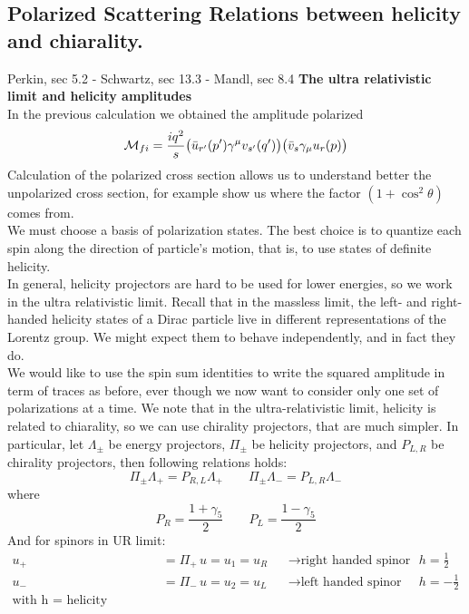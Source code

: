 \documentclass[TheoreticalPhy_ModB.tex]{subfiles}
\begin{document}
\subsection{Polarized Scattering Relations between helicity and chiarality.}
\textsf{Perkin, sec 5.2 - Schwartz, sec 13.3 - Mandl, sec 8.4}
\textbf{The ultra relativistic limit and helicity amplitudes}\\
In the previous calculation we obtained the amplitude polarized
\[
\mathcal{M}_{fi} = \frac{iq^2}{s} \bigl( \bar{u}_{r'} (p') \gamma^{\mu} v_{s'} (q') \bigr) \bigl( \bar{v}_s \gamma_{\mu} u_r(p) \bigr)
\]
Calculation of the polarized cross section allows us to understand better the unpolarized cross section, for example show us where the factor $(1 + \cos^2 \theta)$ comes from.\\
We must choose a basis of polarization states. The best choice is to quantize each spin along the direction of particle's motion, that is, to use states of definite helicity.\\
In general, helicity projectors are hard to be used for lower energies, so we work in the ultra relativistic limit. Recall that in the massless limit, the left- and right-handed helicity states of a Dirac particle live in different representations of the Lorentz group. We might expect them to behave independently, and in fact they do.\\
We would like to use the spin sum identities to write the squared amplitude in term of traces as before, ever though we now want to consider only one set of polarizations at a time. We note that in the ultra-relativistic limit, helicity is related to chiarality, so we can use chirality projectors, that are much simpler. In particular, let $\Lambda_{\pm}$ be energy projectors, $\Pi_{\pm}$ be helicity projectors, and $P_{L, R}$ be chirality projectors, then following relations holds:
\[
\Pi_{\pm}\Lambda_+ = P_{R, L}\Lambda_+
\qquad
\Pi_{\pm}\Lambda_- = P_{L, R}\Lambda_-
\]
where
\[
P_R = \frac{1 + \gamma_5}{2}
\qquad
P_L = \frac{1 - \gamma_5}{2}
\]
And for spinors in UR limit:
\begin{align*}
u_+ 	& = \Pi_+ \, u = u_1 = u_R & &\to \text{right handed spinor}	& & h = \frac{1}{2} \\
u_- 	& = \Pi_- \, u = u_2 = u_L 	& &\to \text{left handed spinor}		& & h = -\frac{1}{2} \\
\text{with h = helicity eigenvalue}
\end{align*}

\begin{center}

\end{center}
\end{document}

